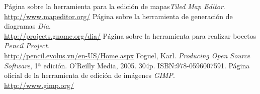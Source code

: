 \begin{thebibliography}{99}
Página sobre la herramienta para la edición de mapas\emph{Tiled Map Editor}.\\ \url{http://www.mapeditor.org/}
Página sobre la herramienta de generación de diagramas \emph{Dia}.\\ \url{http://projects.gnome.org/dia/}
Página sobre la herramienta para realizar bocetos \emph{Pencil Project}.\\ \url{http://pencil.evolus.vn/en-US/Home.aspx}
Foguel, Karl. \emph{Producing Open Source Software}, 1ª edición. O'Reilly Media, 2005. 304p. ISBN:978-0596007591.
Página oficial de la herramienta de edición de imágenes \emph{GIMP}.\\ \url{http://www.gimp.org/}
\end{thebibliography}
